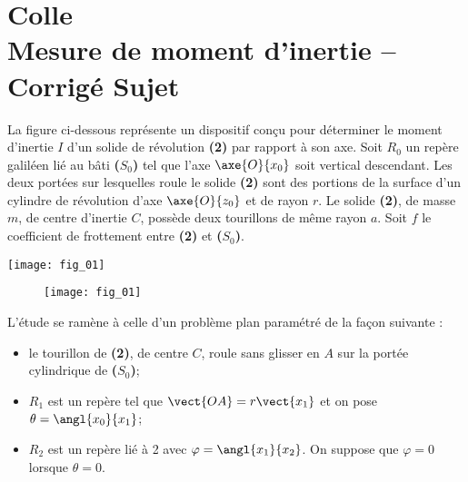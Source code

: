 \chapter*{Colle  \\ 
Mesure de moment d'inertie -- \ifprof Corrigé \else Sujet \fi}

\iflivret {} \else
\ifprof  {} \else \fi
\fi

\setcounter{question}{0}



La figure ci-dessous représente un dispositif conçu pour déterminer le moment d'inertie $I$ d'un solide de révolution \textbf{(2)} par rapport à son axe. Soit $R_0$ un repère galiléen lié au bâti \textbf{($S_0$)} tel que l'axe $\axe{O}{x_0}$ soit vertical descendant. Les deux portées sur lesquelles roule le solide \textbf{(2)} sont des portions de la surface d'un cylindre de révolution d'axe $\axe{O}{z_0}$ et de rayon $r$.
Le solide \textbf{(2)}, de masse $m$, de centre d'inertie $C$, possède deux tourillons de même rayon $a$. Soit $f$ le coefficient de frottement entre \textbf{(2)} et \textbf{($S_0$)}.

\ifprof
\begin{marginfigure}
\texttt{[image: fig\_01]}
\end{marginfigure}
\else
\begin{figure}[!h]
\centering
\texttt{[image: fig\_01]}
\end{figure}
\fi

L'étude se ramène à celle d'un problème plan paramétré de la façon suivante :
\begin{itemize}
\item le tourillon de \textbf{(2)}, de centre $C$, roule sans glisser en $A$ sur la portée cylindrique de \textbf{($S_0$)};
\item $R_1$ est un repère tel que $\vect{OA} = r\vect{x_1}$ et on pose $\theta=\angl{x_0}{x_1}$;
\item $R_2$ est un repère lié à 2 avec $\varphi=\angl{x_1}{x_2}$. On suppose que $\varphi = 0$ lorsque $\theta=0$.
\end{itemize}


